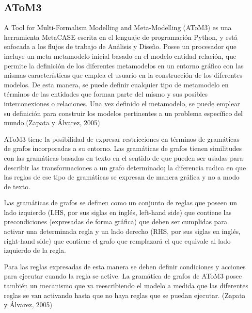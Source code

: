 \subsection{AToM3}
\begin{spacing}{2.0}
\end{spacing}

A Tool for Multi-Formalism Modelling and Meta-Modelling (AToM3) es una herramienta MetaCASE escrita en el lenguaje de programación Python, y está enfocada a los flujos de trabajo de Análisis y Diseño. Posee un procesador que incluye un meta-metamodelo inicial basado en el modelo entidad-relación, que permite la definición de los diferentes metamodelos en un entorno gráfico con las mismas características que emplea el usuario en la construcción de los diferentes modelos. De esta manera, se puede definir cualquier tipo de metamodelo en términos de las entidades que forman parte del mismo y sus posibles interconexiones o relaciones. Una vez definido el metamodelo, se puede emplear su definición para construir los modelos pertinentes a un problema específico del mundo.(Zapata y Álvarez, 2005)

AToM3 tiene la posibilidad de expresar restricciones en términos de gramáticas de grafos incorporadas a su entorno. Las gramáticas de grafos tienen similitudes con las gramáticas basadas en texto en el sentido de que pueden ser usadas para describir las transformaciones a un grafo determinado; la diferencia radica en que las reglas de ese tipo de gramáticas se expresan de manera gráfica y no a modo de texto.

Las gramáticas de grafos se definen como un conjunto de reglas que poseen un lado izquierdo (LHS, por sus siglas en inglés, left-hand side) que contiene las precondiciones (expresadas de forma gráfica) que deben ser cumplidas para activar una determinada regla y un lado derecho (RHS, por sus siglas en inglés, right-hand side) que contiene el grafo que remplazará el que equivale al lado izquierdo de la regla.

Para las reglas expresadas de esta manera se deben definir condiciones y acciones para ejecutar cuando la regla se active. La gramática de grafos de AToM3 posee también un mecanismo que va reescribiendo el modelo a medida que las diferentes reglas se van activando hasta que no haya reglas que se puedan ejecutar. (Zapata y Álvarez, 2005)

\begin{spacing}{2.0}
\end{spacing}

